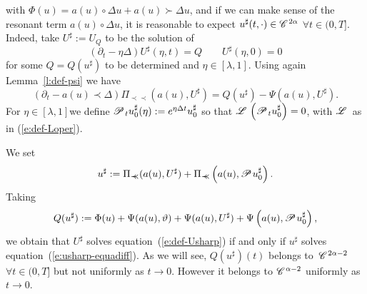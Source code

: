 \documentclass[11pt,reqno]{amsart}
\newcommand{\assign}{:=}
\newcommand{\cdummy}{\cdot}
\newcommand{\precprec}{\prec\!\!\!\prec}
\newcommand{\CC}{\mathscr{C} \hspace{.1em}}
\newcommand{\LL}{\mathscr{L} \hspace{.2em}}
\newcommand{\PP}{\mathscr{P} \hspace{.1em}}
\begin{document}
with $\Phi (u) = a (u) \circ \Delta u + a (u) \succ \Delta u$, and if we can
make sense of the resonant term $a (u) \circ \Delta u$, it is reasonable to
expect $u^{\sharp} (t, \cdummy) \in \CC^{2 \alpha}$ $\forall t \in (0, T]$.
Indeed, take $U^{\sharp} \assign U_Q$ to be the solution of
\begin{equation}
  (\partial_t - \eta \Delta) U^{\sharp} (\eta, t) = Q \qquad U^{\sharp} (\eta,
  0) = 0 \label{e:def-Usharp} 
\end{equation}
for some $Q = Q (u^{\sharp})$ to be determined and $\eta \in [\lambda, 1]$.
Using again Lemma~\ref{l:def-psi} we have
\[ (\partial_t - a (u) \prec \Delta) \Pi_{\precprec} (a (u), U^{\sharp}) = Q
   (u^{\sharp}) - \Psi (a (u), U^{\sharp}) . \]
For $\eta \in [\lambda, 1] $we define $\PP_t u_0^{\sharp} (\eta) \assign
e^{\eta \Delta t} u_0^{\sharp}$ so that $\LL \left( \PP_t u_0^{\sharp} \right)
= 0$, with $\LL$ as in (\ref{e:def-Loper}).

We set
\begin{equation}
  u^{\sharp} \assign \Pi_{\precprec} (a (u), U^{\sharp}) + \Pi_{\precprec}
  \left( a (u), \PP u_0^{\sharp} \right) . \label{eq:decomp-sharp}
\end{equation}
Taking
\[ Q (u^{\sharp}) : = \Phi (u) + \Psi (a (u), \vartheta) + \Psi (a (u),
   U^{\sharp}) + \Psi \left( a (u), \PP u_0^{\sharp} \right), \]
we obtain that $U^{\sharp}$ solves equation~(\ref{e:def-Usharp}) if and only
if $u^{\sharp}$ solves equation~(\ref{e:usharp-equadiff}). As we will see, $Q
(u^{\sharp}) (t)$ belongs to~$\CC^{2 \alpha - 2}$ $\forall t \in (0, T]$ but
not uniformly as $t \rightarrow 0$. However it belongs to $\CC^{\alpha - 2}$
uniformly as $t \rightarrow 0$.
\end{document}

